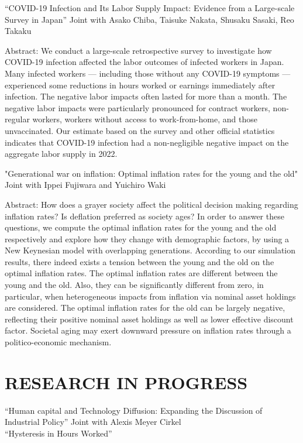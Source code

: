 \documentclass[12pt]{article}
\begin{document}
\vspace{1em}
``COVID-19 Infection and Its Labor Supply Impact: Evidence from a Large-scale Survey in Japan'' Joint with Asako Chiba, Taisuke Nakata, Shusaku Sasaki, Reo Takaku
\begin{adjustwidth}{1em}{1em}
Abstract: We conduct a large-scale retrospective survey to investigate how COVID-19 infection affected the labor outcomes of infected workers in Japan. Many infected workers --- including those without any COVID-19 symptoms --- experienced some reductions in hours worked or earnings immediately after infection. The negative labor impacts often lasted for more than a month. The negative labor impacts were particularly pronounced for contract workers, non-regular workers, workers without access to work-from-home, and those unvaccinated. Our estimate based on the survey and other official statistics indicates that COVID-19 infection had a non-negligible negative impact on the aggregate labor supply in 2022.
\end{adjustwidth}
\vspace{1em}
"Generational war on inflation: Optimal inflation rates for the young and the old" Joint with Ippei Fujiwara and Yuichiro Waki
\begin{adjustwidth}{1em}{1em}
Abstract: How does a grayer society affect the political decision making regarding inflation rates? Is deflation preferred as society ages? In order to answer these questions, we compute the optimal inflation rates for the young and the old respectively and explore how they change with demographic factors, by using a New Keynesian model with overlapping generations. According to our simulation results, there indeed exists a tension between the young and the old on the optimal inflation rates. The optimal inflation rates are different between the young and the old. Also, they can be significantly different from zero, in particular, when heterogeneous impacts from inflation via nominal asset holdings are considered. The optimal inflation rates for the old can be largely negative, reflecting their positive nominal asset holdings as well as lower effective discount factor. Societal aging may exert downward pressure on inflation rates through a politico-economic mechanism.
\end{adjustwidth}

\section*{RESEARCH IN PROGRESS}
``Human capital and Technology Diffusion: Expanding the Discussion of Industrial Policy'' Joint with Alexis Meyer Cirkel\\
``Hysteresis in Hours Worked''\\
\end{document}
